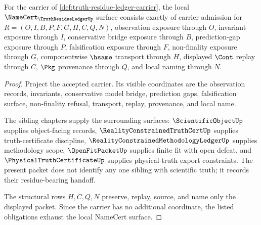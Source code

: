 \begin{theorem}
\label{thm:truth-residue-ledger-namecert-obligations}
For the carrier of \autoref{def:truth-residue-ledger-carrier}, the local $\NameCert_{\TruthResidueLedgerUp}$ surface consists exactly of carrier admission for $R=(O,I,B,P,F,G,H,C,Q,N)$, observation exposure through $O$, invariant exposure through $I$, conservative bridge exposure through $B$, prediction-gap exposure through $P$, falsification exposure through $F$, non-finality exposure through $G$, componentwise $\hsame$ transport through $H$, displayed $\Cont$ replay through $C$, $\Pkg$ provenance through $Q$, and local naming through $N$.
\end{theorem}
\begin{proof}
Project the accepted carrier. Its visible coordinates are the observation records, invariants, conservative model bridge, prediction gaps, falsification surface, non-finality refusal, transport, replay, provenance, and local name.

The sibling chapters supply the surrounding surfaces: $\ScientificObjectUp$ supplies object-facing records, $\RealityConstrainedTruthCertUp$ supplies truth-certificate discipline, $\RealityConstrainedMethodologyLedgerUp$ supplies methodology scope, $\OpenFitPacketUp$ supplies finite fit with open defeat, and $\PhysicalTruthCertificateUp$ supplies physical-truth export constraints. The present packet does not identify any one sibling with scientific truth; it records their residue-bearing handoff.

The structural rows $H,C,Q,N$ preserve, replay, source, and name only the displayed packet. Since the carrier has no additional coordinate, the listed obligations exhaust the local NameCert surface.
\end{proof}

